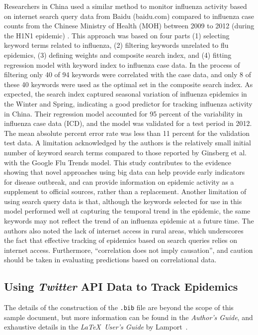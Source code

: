 \documentclass[sigconf]{acmart}
\begin{document}
Researchers in China used a similar method to monitor influenza activity based 
on internet search query data from Baidu (baidu.com) compared to influenza case 
counts from the Chinese Ministry of Health (MOH) between 2009 to 2012 (during the 
H1N1 epidemic) \cite{yuan13}. This approach was based on four parts (1) selecting 
keyword terms related to influenza, (2) filtering keywords unrelated to flu 
epidemics, (3) defining weights and composite search index, and (4) fitting 
regression model with keyword index to influenza case data. In the process of 
filtering only 40 of 94 keywords were correlated with the case data, and only 8 
of these 40 keywords were used as the optimal set in the composite search index. 
As expected, the search index captured seasonal variation of influenza epidemics in 
the Winter and Spring, indicating a good predictor for tracking influenza activity
in China.  Their regression model accounted for 95 percent of the variability in 
influenza case data (ICD), and the model was validated for a test period in 2012. 
The mean absolute percent error rate was less than 11 percent for the validation 
test data. A limitation acknowledged by the authors is the relatively small initial 
number of keyword search terms compared to those reported by Ginsberg et al. with 
the Google Flu Trends model. This study contributes to the evidence showing that novel 
approaches using big data can help provide early indicators for disease outbreak, 
and can provide information on epidemic activity as a supplement to official sources, 
rather than a replacement. Another limitation of using search query data is that, 
although the keywords selected for use in this model performed well at capturing 
the temporal trend in the epidemic, the same keywords may not reflect the trend of 
an influenza epidemic at a future time. The authors also noted the lack of internet 
access in rural areas, which underscores the fact that effective tracking of epidemics 
based on search queries relies on internet access. Furthermore, “correlation does 
not imply causation”, and caution should be taken in evaluating predictions based 
on correlational data.    

\subsection{Using {\itshape Twitter} API Data to Track Epidemics}

The details of the construction of the \texttt{.bib} file are beyond
the scope of this sample document, but more information can be found
in the \textit{Author's Guide}, and exhaustive details in the
\textit{\LaTeX\ User's Guide} by Lamport~.
\end{document}
